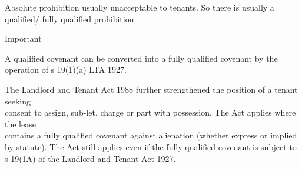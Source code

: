 \documentclass[
]{article}
\newenvironment{env-4361be9f-9a08-465c-86d1-6b024e2d00e2}
{
    \savenotes\tcolorbox[blanker,breakable,left=5pt,borderline west={2pt}{-4pt}{cyan}]
}
{
    \endtcolorbox\spewnotes
}
\begin{document}
Absolute prohibition usually unacceptable to tenants. So there is
usually a qualified/ fully qualified prohibition.

\begin{env-4361be9f-9a08-465c-86d1-6b024e2d00e2}

Important

A qualified covenant can be converted into a fully qualified covenant by
the operation of s 19(1)(a) LTA 1927.

\end{env-4361be9f-9a08-465c-86d1-6b024e2d00e2}

The Landlord and Tenant Act 1988 further strengthened the position of a
tenant seeking\\
consent to assign, sub-let, charge or part with possession. The Act
applies where the lease\\
contains a fully qualified covenant against alienation (whether express
or implied by statute). The Act still applies even if the fully
qualified covenant is subject to s 19(1A) of the Landlord and Tenant Act
1927.
\end{document}
